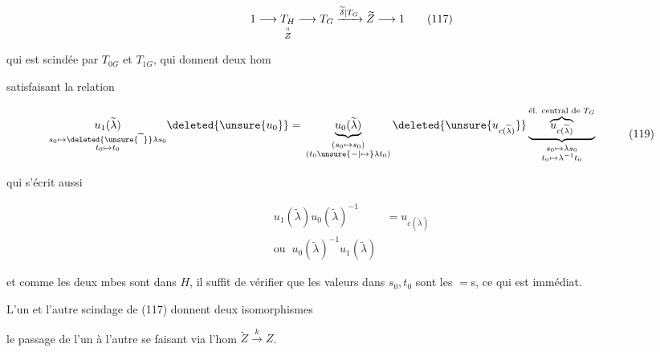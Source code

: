 
\[1\longrightarrow\underset{\substack{\shortparallel\\Z}}{T_H}\longrightarrow T_G\xrightarrow{\widetilde\delta|T_G}\widetilde Z\longrightarrow1\tag*{(117)}\]

qui est scindée par $T_{0G}$ et $T_{1G}$, qui donnent deux  hom


satisfaisant la relation

\[\begin{aligned}
\underset{\substack{s_0\mapsto\deleted{\unsure{\widetilde{\phantom{\lambda}}}}\lambda s_0\\t_0\mapsto t_0}}{u_1(\widetilde\lambda)}\deleted{\unsure{u_0}}
={}&\underbrace{u_0(\widetilde\lambda)}_{\substack{(s_0\mapsto s_0)\\(t_0\unsure{-|\mapsto}\lambda t_0)}}
\deleted{\unsure{u_{c(\widetilde\lambda)}}}
\underbrace{\overbrace{u_{c(\widetilde\lambda)}}^{\text{él. central de }T_G}}_{\substack{s_0\mapsto\lambda s_0\\t_0\mapsto\lambda^{-1}t_0}}
\end{aligned}\tag*{(119)}\]

qui  s'écrit aussi

\[\begin{aligned}
u_1(\widetilde\lambda)u_0(\widetilde\lambda)^{-1}&=u_{c(\widetilde\lambda)}\\
\text{ou }\ u_0(\widetilde\lambda)^{-1}u_1(\widetilde\lambda)&
\end{aligned}\]

et comme les  deux mbes sont dans $H$, il suffit de vérifier que les valeurs dans $s_0,t_0$ sont les $=$s, ce qui est immédiat.

L'un et l'autre scindage de (117) donnent deux isomorphismes


le passage de l'un à l'autre se faisant via l'hom $\widetilde Z\xrightarrow{k}Z$.

